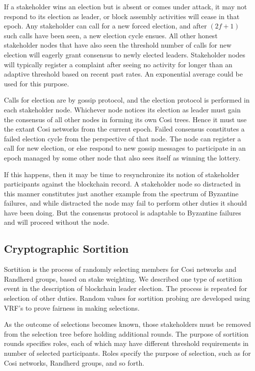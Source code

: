 \documentclass{yellowpaper}
\begin{document}
If a stakeholder wins an election but is absent or comes under attack, it may not respond to its election as leader, or block assembly activities will cease in that epoch. Any stakeholder can call for a new forced election, and after $(2 f+1)$ such calls have been seen, a new election cycle ensues. All other honest stakeholder nodes that have also seen the threshold number of calls for new election will eagerly grant consensus to newly elected leaders. Stakeholder nodes will typically register a complaint after seeing no activity for longer than an adaptive threshold based on recent past rates. An exponential average could be used for this purpose. 

Calls for election are by gossip protocol, and the election protocol is performed in each stakeholder node. Whichever node notices its election as leader must gain the consensus of all other nodes in forming its own Cosi trees. Hence it must use the extant Cosi networks from the current epoch. Failed consensus constitutes a failed election cycle from the perspective of that node. The node can register a call for new election, or else respond to new gossip messages to participate in an epoch managed by some other node that also sees itself as winning the lottery. 

If this happens, then it may be time to resynchronize its notion of stakeholder participants against the blockchain record. A stakeholder node so distracted in this manner constitutes just another example from the spectrum of Byzantine failures, and while distracted the node may fail to perform other duties it should have been doing. But the consensus protocol is adaptable to Byzantine failures and will proceed without the node.

\subsection{Cryptographic Sortition}
Sortition\cite{algorand} is the process of randomly selecting members for Cosi networks and Randherd groups, based on stake weighting. We described one type of sortition event in the description of blockchain leader election. The process is repeated for selection of other duties. Random values for sortition probing are developed using VRF's to prove fairness in making selections.

As the outcome of selections becomes known, those stakeholders must be removed from the selection tree before holding additional rounds. The purpose of sortition rounds specifies roles, each of which may have different threshold requirements in number of selected participants. Roles specify the purpose of selection, such as for Cosi networks, Randherd groups, and so forth.
\end{document}
